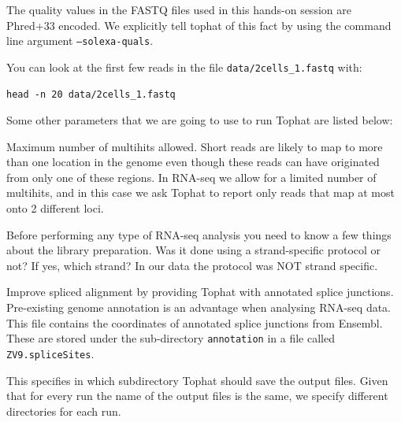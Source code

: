 \begin{note}
The quality values in the FASTQ files used in this hands-on session are Phred+33
encoded. We explicitly tell tophat of this fact by using the command line
argument \texttt{--solexa-quals}.
\end{note}

\begin{information}
You can look at the first few reads in the file \texttt{data/2cells\_1.fastq} with:
 
\begin{lstlisting}
head -n 20 data/2cells_1.fastq
\end{lstlisting}
\end{information}

\begin{note}
Some other parameters that we are going to use to run Tophat are listed below:
\begin{description}[style=multiline,labelindent=0cm,align=right,leftmargin=\descriptionlabelspace,rightmargin=1.5cm,font=\ttfamily]
 \item[-g] Maximum number of multihits allowed. Short reads are likely to map to
 more than one location in the genome even though these reads can have originated
 from only one of these regions. In RNA-seq we allow for a limited number of
 multihits, and in this case we ask Tophat to report only reads that map at most
 onto 2 different loci.
 \item[--library-type] Before performing any type of RNA-seq analysis you need
 to know a few things about the library preparation. Was it done using a
 strand-specific protocol or not? If yes, which strand? In our data the protocol
 was NOT strand specific.
 \item[-j] Improve spliced alignment by providing Tophat with annotated splice
 junctions. Pre-existing genome annotation is an advantage when analysing RNA-seq
 data. This file contains the coordinates of annotated splice junctions from Ensembl.
 These are stored under the sub-directory \texttt{annotation} in a file called
 \texttt{ZV9.spliceSites}.
 \item[-o] This specifies in which subdirectory Tophat should save the output
 files. Given that for every run the name of the output files is the same, we
 specify different directories for each run.
\end{description}
\end{note}

